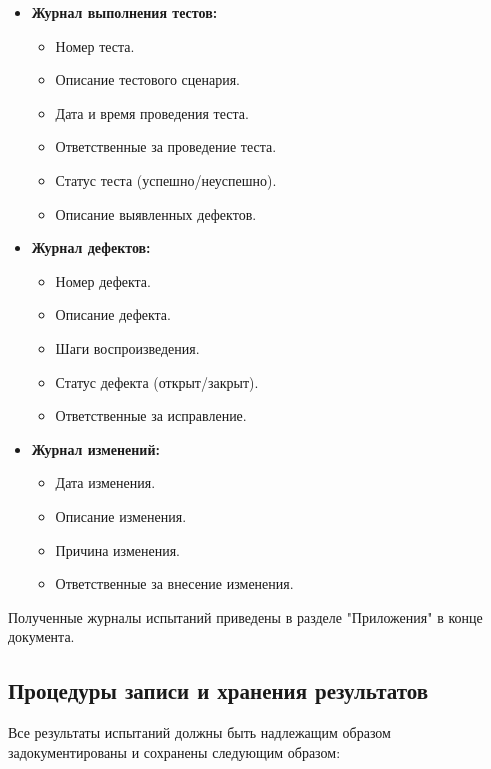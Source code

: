 \documentclass{article}
\begin{document}
    \begin{itemize}
        \item \textbf{Журнал выполнения тестов:}
        \begin{itemize}
            \item Номер теста.
            \item Описание тестового сценария.
            \item Дата и время проведения теста.
            \item Ответственные за проведение теста.
            \item Статус теста (успешно/неуспешно).
            \item Описание выявленных дефектов.
        \end{itemize}
        \item \textbf{Журнал дефектов:}
        \begin{itemize}
            \item Номер дефекта.
            \item Описание дефекта.
            \item Шаги воспроизведения.
            \item Статус дефекта (открыт/закрыт).
            \item Ответственные за исправление.
        \end{itemize}
        \item \textbf{Журнал изменений:}
        \begin{itemize}
            \item Дата изменения.
            \item Описание изменения.
            \item Причина изменения.
            \item Ответственные за внесение изменения.
        \end{itemize}
    \end{itemize}

    Полученные журналы испытаний приведены в разделе "{}Приложения"{} в конце документа.

    \subsection{Процедуры записи и хранения результатов}

    Все результаты испытаний должны быть надлежащим образом задокументированы и сохранены следующим образом:
\end{document}
